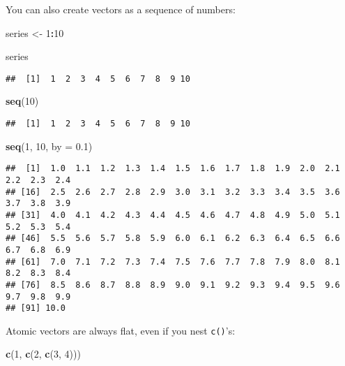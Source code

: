 \documentclass[
]{book}
\newenvironment{Shaded}{\begin{snugshade}}{\end{snugshade}}
\newcommand{\DataTypeTok}[1]{\textcolor[rgb]{0.13,0.29,0.53}{#1}}
\newcommand{\DecValTok}[1]{\textcolor[rgb]{0.00,0.00,0.81}{#1}}
\newcommand{\FloatTok}[1]{\textcolor[rgb]{0.00,0.00,0.81}{#1}}
\newcommand{\KeywordTok}[1]{\textcolor[rgb]{0.13,0.29,0.53}{\textbf{#1}}}
\newcommand{\NormalTok}[1]{#1}
\newcommand{\OperatorTok}[1]{\textcolor[rgb]{0.81,0.36,0.00}{\textbf{#1}}}
\newcommand{\StringTok}[1]{\textcolor[rgb]{0.31,0.60,0.02}{#1}}
\begin{document}
You can also create vectors as a sequence of numbers:

\begin{Shaded}
\begin{Highlighting}[]
\NormalTok{series \textless{}{-}}\StringTok{ }\DecValTok{1}\OperatorTok{:}\DecValTok{10}

\NormalTok{series}
\end{Highlighting}
\end{Shaded}

\begin{verbatim}
##  [1]  1  2  3  4  5  6  7  8  9 10
\end{verbatim}

\begin{Shaded}
\begin{Highlighting}[]
\KeywordTok{seq}\NormalTok{(}\DecValTok{10}\NormalTok{)}
\end{Highlighting}
\end{Shaded}

\begin{verbatim}
##  [1]  1  2  3  4  5  6  7  8  9 10
\end{verbatim}

\begin{Shaded}
\begin{Highlighting}[]
\KeywordTok{seq}\NormalTok{(}\DecValTok{1}\NormalTok{, }\DecValTok{10}\NormalTok{, }\DataTypeTok{by =} \FloatTok{0.1}\NormalTok{)}
\end{Highlighting}
\end{Shaded}

\begin{verbatim}
##  [1]  1.0  1.1  1.2  1.3  1.4  1.5  1.6  1.7  1.8  1.9  2.0  2.1  2.2  2.3  2.4
## [16]  2.5  2.6  2.7  2.8  2.9  3.0  3.1  3.2  3.3  3.4  3.5  3.6  3.7  3.8  3.9
## [31]  4.0  4.1  4.2  4.3  4.4  4.5  4.6  4.7  4.8  4.9  5.0  5.1  5.2  5.3  5.4
## [46]  5.5  5.6  5.7  5.8  5.9  6.0  6.1  6.2  6.3  6.4  6.5  6.6  6.7  6.8  6.9
## [61]  7.0  7.1  7.2  7.3  7.4  7.5  7.6  7.7  7.8  7.9  8.0  8.1  8.2  8.3  8.4
## [76]  8.5  8.6  8.7  8.8  8.9  9.0  9.1  9.2  9.3  9.4  9.5  9.6  9.7  9.8  9.9
## [91] 10.0
\end{verbatim}

Atomic vectors are always flat, even if you nest \texttt{c()}'s:

\begin{Shaded}
\begin{Highlighting}[]
\KeywordTok{c}\NormalTok{(}\DecValTok{1}\NormalTok{, }\KeywordTok{c}\NormalTok{(}\DecValTok{2}\NormalTok{, }\KeywordTok{c}\NormalTok{(}\DecValTok{3}\NormalTok{, }\DecValTok{4}\NormalTok{)))}
\end{Highlighting}
\end{Shaded}
\end{document}
